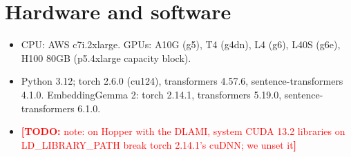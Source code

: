 \documentclass{article}
\newcommand{\todo}[1]{\textcolor{red}{\textbf{[TODO:} #1\textbf{]}}}
\begin{document}
\section{Hardware and software}\label{app:stack}
\begin{itemize}
  \item CPU: AWS c7i.2xlarge. GPUs: A10G (g5), T4 (g4dn), L4 (g6), L40S (g6e), H100 80GB (p5.4xlarge capacity block).
  \item Python 3.12; torch 2.6.0 (cu124), transformers 4.57.6, sentence-transformers 4.1.0. EmbeddingGemma 2: torch 2.14.1, transformers 5.19.0, sentence-transformers 6.1.0.
  \item \todo{note: on Hopper with the DLAMI, system CUDA 13.2 libraries on LD\_LIBRARY\_PATH break torch 2.14.1's cuDNN; we unset it}
\end{itemize}
\end{document}
